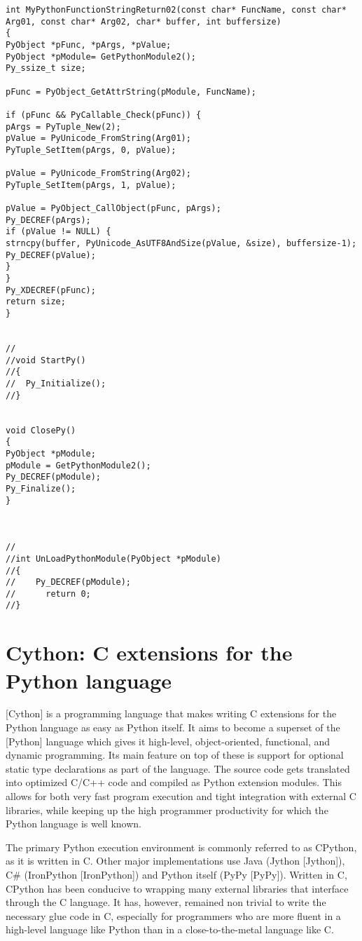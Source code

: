 \begin{lstlisting}
int MyPythonFunctionStringReturn02(const char* FuncName, const char* Arg01, const char* Arg02, char* buffer, int buffersize)
{
PyObject *pFunc, *pArgs, *pValue;
PyObject *pModule= GetPythonModule2();
Py_ssize_t size;

pFunc = PyObject_GetAttrString(pModule, FuncName);

if (pFunc && PyCallable_Check(pFunc)) {
pArgs = PyTuple_New(2);
pValue = PyUnicode_FromString(Arg01);
PyTuple_SetItem(pArgs, 0, pValue);

pValue = PyUnicode_FromString(Arg02);
PyTuple_SetItem(pArgs, 1, pValue);

pValue = PyObject_CallObject(pFunc, pArgs);
Py_DECREF(pArgs);
if (pValue != NULL) {
strncpy(buffer, PyUnicode_AsUTF8AndSize(pValue, &size), buffersize-1);
Py_DECREF(pValue);
}
}
Py_XDECREF(pFunc);
return size;
}


//
//void StartPy()
//{
//	Py_Initialize();
//}


void ClosePy()
{
PyObject *pModule;
pModule = GetPythonModule2();
Py_DECREF(pModule);
Py_Finalize();
}



//
//int UnLoadPythonModule(PyObject *pModule)
//{
//	  Py_DECREF(pModule);
//		return 0;
//}

\end{lstlisting}





\newpage
\section{Cython: C extensions for the Python language}

[Cython] is a programming language that makes writing C extensions for the Python language as easy as Python itself. It aims to become a superset of the [Python] language which gives it high-level, object-oriented, functional, and dynamic programming. Its main feature on top of these is support for optional static type declarations as part of the language. The source code gets translated into optimized C/C++ code and compiled as Python extension modules. This allows for both very fast program execution and tight integration with external C libraries, while keeping up the high programmer productivity for which the Python language is well known.

The primary Python execution environment is commonly referred to as CPython, as it is written in C. Other major implementations use Java (Jython [Jython]), C\# (IronPython [IronPython]) and Python itself (PyPy [PyPy]). Written in C, CPython has been conducive to wrapping many external libraries that interface through the C language. It has, however, remained non trivial to write the necessary glue code in C, especially for programmers who are more fluent in a high-level language like Python than in a close-to-the-metal language like C.

